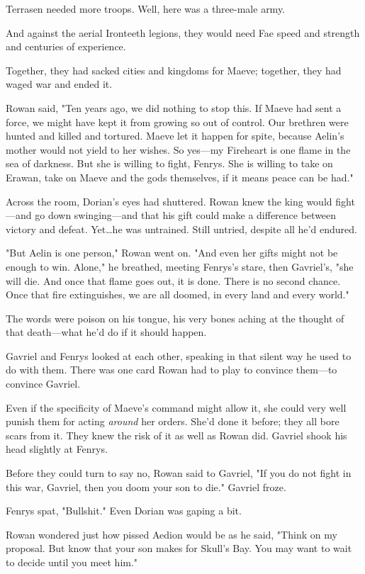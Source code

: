 Terrasen needed more troops.
Well, here was a three-male army.

And against the aerial Ironteeth legions, they would need Fae speed and strength and centuries of experience.

Together, they had sacked cities and kingdoms for Maeve; together, they had waged war and ended it.

Rowan said, "Ten years ago, we did nothing to stop this.
If Maeve had sent a force, we might have kept it from growing so out of control.
Our brethren were hunted and killed and tortured.
Maeve let it happen for spite, because Aelin's mother would not yield to her wishes.
So yes---my Fireheart is one flame in the sea of darkness.
But she is willing to fight, Fenrys.
She is willing to take on Erawan, take on Maeve and the gods themselves, if it means peace can be had."

Across the room, Dorian's eyes had shuttered.
Rowan knew the king would fight---and go down swinging---and that his gift could make a difference between victory and defeat.
Yet\ldots he was untrained.
Still untried, despite all he'd endured.

"But Aelin is one person," Rowan went on.
"And even her gifts might not be enough to win.
Alone," he breathed, meeting Fenrys's stare, then Gavriel's, "she will die.
And once that flame goes out, it is done.
There is no second chance.
Once that fire extinguishes, we are all doomed, in every land and every world."

The words were poison on his tongue, his very bones aching at the thought of that death---what he'd do if it should happen.

Gavriel and Fenrys looked at each other, speaking in that silent way he used to do with them.
There was one card Rowan had to play to convince them---to convince Gavriel.

Even if the specificity of Maeve's command might allow it, she could very well punish them for acting \emph{around} her orders.
She'd done it before; they all bore scars from it.
They knew the risk of it as well as Rowan did.
Gavriel shook his head slightly at Fenrys.

Before they could turn to say no, Rowan said to Gavriel, "If you do not fight in this war, Gavriel, then you doom your son to die."
Gavriel froze.

Fenrys spat, "Bullshit."
Even Dorian was gaping a bit.

Rowan wondered just how pissed Aedion would be as he said, "Think on my proposal.
But know that your son makes for Skull's Bay.
You may want to wait to decide until you meet him."

